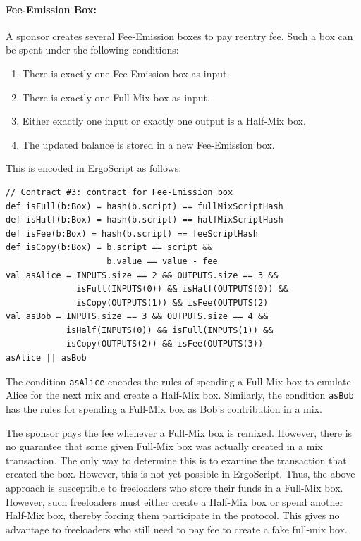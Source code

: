\documentclass[runningheads]{llncs}
\newcommand{\langname}{ErgoScript\xspace}
\begin{document}
\paragraph{Fee-Emission Box:} A sponsor creates several Fee-Emission boxes to pay reentry fee. Such a box can be spent under the following conditions:

\begin{enumerate}
    \item There is exactly one Fee-Emission box as input.
    \item There is exactly one Full-Mix box as input.
    \item Either exactly one input or exactly one output is a Half-Mix box.
    \item The updated balance is stored in a new Fee-Emission box.
\end{enumerate}

This is encoded in \langname as follows:

{\small
\begin{Verbatim}[frame=single]
// Contract #3: contract for Fee-Emission box
def isFull(b:Box) = hash(b.script) == fullMixScriptHash 
def isHalf(b:Box) = hash(b.script) == halfMixScriptHash
def isFee(b:Box) = hash(b.script) == feeScriptHash
def isCopy(b:Box) = b.script == script && 
                    b.value == value - fee
val asAlice = INPUTS.size == 2 && OUTPUTS.size == 3 &&
              isFull(INPUTS(0)) && isHalf(OUTPUTS(0)) &&
              isCopy(OUTPUTS(1)) && isFee(OUTPUTS(2)
val asBob = INPUTS.size == 3 && OUTPUTS.size == 4 &&
            isHalf(INPUTS(0)) && isFull(INPUTS(1)) &&
            isCopy(OUTPUTS(2)) && isFee(OUTPUTS(3))
asAlice || asBob 
\end{Verbatim}
}

The condition \texttt{asAlice} encodes the rules of spending a Full-Mix box to emulate Alice for the next mix and create a Half-Mix box. Similarly, the condition \texttt{asBob} has the rules for spending a Full-Mix box as Bob's contribution in a mix. 

The sponsor pays the fee whenever a Full-Mix box is remixed. However, there is no guarantee that some given Full-Mix box was actually created in a mix transaction. The only way to determine this is to examine the transaction that created the box. However, this is not yet possible in \langname. Thus, the above approach is susceptible to freeloaders who store their funds in a Full-Mix box. However, such freeloaders must either create a Half-Mix box or spend another Half-Mix box, thereby forcing them participate in the protocol. This gives no advantage to freeloaders who still need to pay fee to create a fake full-mix box. 
\end{document}
